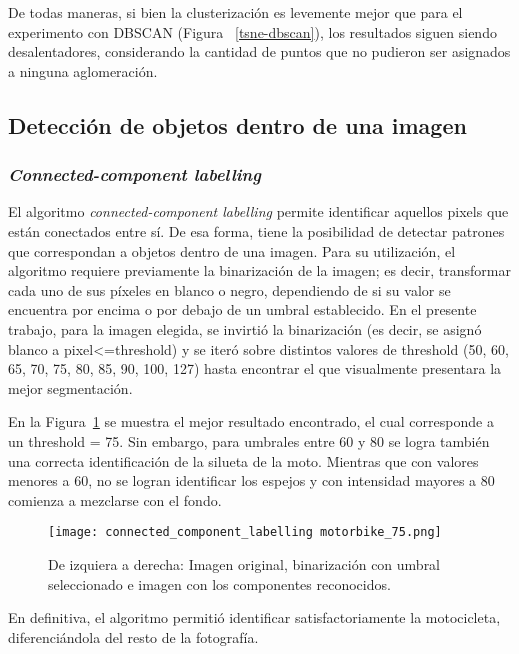 \documentclass[journal,article,submit,pdftex,moreauthors]{Definitions/mdpi}
\begin{document}
De todas maneras, si bien la clusterización es levemente mejor que para el experimento con DBSCAN (Figura ~\ref{tsne-dbscan}), los resultados siguen siendo desalentadores, considerando la cantidad de puntos que no pudieron ser asignados a ninguna aglomeración. 

\subsection{Detección de objetos dentro de una imagen}

\subsubsection{\textit{Connected-component labelling}}

El algoritmo \textit{connected-component labelling} permite identificar aquellos pixels que están conectados entre sí. De esa forma, tiene la posibilidad de detectar patrones que correspondan a objetos dentro de una imagen. Para su utilización, el algoritmo requiere previamente la binarización de la imagen; es decir, transformar cada uno de sus píxeles en blanco o negro, dependiendo de si su valor se encuentra por encima o por debajo de un umbral establecido. En el presente trabajo, para la imagen elegida, se invirtió la binarización (es decir, se asignó blanco a pixel<=threshold) y se iteró sobre distintos valores de threshold (50, 60, 65, 70, 75, 80, 85, 90, 100, 127) hasta encontrar el que visualmente presentara la mejor segmentación.

En la Figura~\ref{connected_component_labelling} se muestra el mejor resultado encontrado, el cual corresponde a un threshold = 75. Sin embargo, para umbrales entre 60 y 80 se logra también una correcta identificación de la silueta de la moto. Mientras que con valores menores a 60, no se logran identificar los espejos y con intensidad mayores a 80 comienza a mezclarse con el fondo.

\begin{figure}[H]
\texttt{[image: connected\_component\_labelling motorbike\_75.png]}
\captionsetup{justification=centering}
\caption{De izquiera a derecha: Imagen original, binarización con umbral seleccionado e imagen con los componentes reconocidos. \label{connected_component_labelling}}
\end{figure}   
\skip

En definitiva, el algoritmo permitió identificar satisfactoriamente la motocicleta, diferenciándola del resto de la fotografía.
\end{document}
